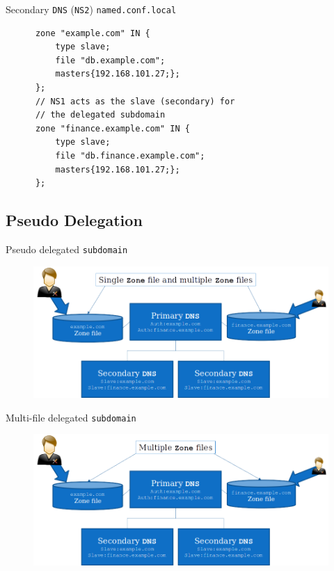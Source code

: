 \documentclass[xcolor=table]{beamer}
\begin{document}
\begin{frame}[fragile]{Secondary \texttt{DNS} (\texttt{NS2}) \texttt{named.conf.local}}
  \begin{tcolorbox}
    \lstset{
      basicstyle=\tiny\ttfamily,
    }
    \begin{lstlisting}
      zone "example.com" IN {
	      type slave;
	      file "db.example.com";
	      masters{192.168.101.27;};
      };
      // NS1 acts as the slave (secondary) for 
      // the delegated subdomain
      zone "finance.example.com" IN {
	      type slave;
	      file "db.finance.example.com";
	      masters{192.168.101.27;};
      };
    \end{lstlisting}
  \end{tcolorbox}
\end{frame}

\subsection{Pseudo Delegation}
\begin{frame}{Pseudo delegated \texttt{subdomain}}
  \begin{figure}
    \begin{center}
      \includegraphics[width=1\linewidth]{PseudoDelegated.png}
    \end{center}
  \end{figure}
\end{frame}

\begin{frame}{Multi-file delegated \texttt{subdomain}}
  \begin{figure}
    \begin{center}
      \includegraphics[width=1\linewidth]{MultipleDelegated.png}
    \end{center}
  \end{figure}
\end{frame}
\end{document}
